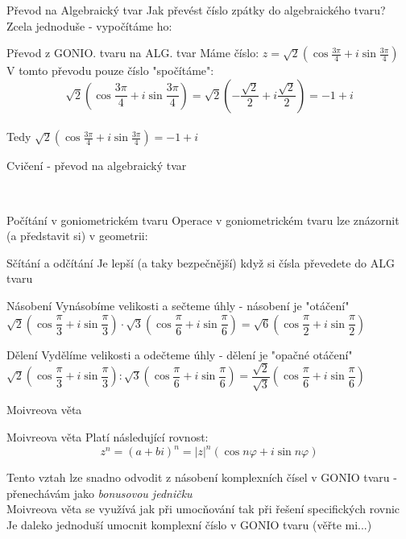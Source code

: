 \documentclass[aspectratio=169]{beamer} %
\newcommand{\reseni}[1]{\ \hfill \hyperlink{#1}{\beamergotobutton{\Large Řešení}}}
\begin{document}
	\begin{frame}{Převod na Algebraický tvar}
	 Jak převést číslo zpátky do algebraického tvaru? Zcela jednoduše - vypočítáme ho:
	 \begin{alertblock}{Převod z GONIO. tvaru na ALG. tvar}
	  Máme číslo: $z=\sqrt{2}(\cos\frac{3\pi}{4}+i\sin\frac{3\pi}{4})$\\[2ex]
	  V tomto převodu pouze číslo "spočítáme": \\[2ex]
	  $$\sqrt{2}\left(\cos\dfrac{3\pi}{4}+i\sin\dfrac{3\pi}{4}\right) = \sqrt{2}\left(-\dfrac{\sqrt{2}}{2}+i\dfrac{\sqrt{2}}{2}\right) = -1+i$$ \\[2ex] Tedy $\sqrt{2}(\cos\frac{3\pi}{4}+i\sin\frac{3\pi}{4}) = -1+i$
	 \end{alertblock}
	\end{frame}
	
	\begin{frame}[label=C4]{Cvičení - převod na algebraický tvar}
	
	\reseni{Ř4}
	\end{frame}
	
	\begin{frame}{Počítání v goniometrickém tvaru}
	Operace v goniometrickém tvaru lze znázornit (a představit si) v geometrii: 
 	 \begin{alertblock}{Sčítání a odčítání}
 	  Je lepší (a taky bezpečnější) když si čísla převedete do ALG tvaru
 	 \end{alertblock}	
 	 \begin{alertblock}{Násobení}
 	 Vynásobíme velikosti a sečteme úhly - násobení je "otáčení" \\
 	 $\sqrt{2}\left(\cos \dfrac{\pi}{3} + i\sin \dfrac{\pi}{3}\right)\cdot \sqrt{3}\left(\cos \dfrac{\pi}{6} + i\sin \dfrac{\pi}{6}\right) = \sqrt{6}\left(\cos \dfrac{\pi}{2} + i\sin \dfrac{\pi}{2}\right)$
 	 \end{alertblock}
 	 \begin{alertblock}{Dělení}
 	 Vydělíme velikosti a odečteme úhly - dělení je "opačné otáčení" \\
 	 $\sqrt{2}\left(\cos \dfrac{\pi}{3} + i\sin \dfrac{\pi}{3}\right):\sqrt{3}\left(\cos \dfrac{\pi}{6} + i\sin \dfrac{\pi}{6}\right) = \dfrac{\sqrt{2}}{\sqrt{3}}\left(\cos \dfrac{\pi}{6} + i\sin \dfrac{\pi}{6}\right)$
 	 \end{alertblock}
	\end{frame}
		
	\begin{frame}{Moivreova věta}
	 \begin{alertblock}{Moivreova věta}
	 Platí následující rovnost:
	 $$z^n = (a+bi)^n = |z|^n(\cos n\varphi + i\sin n\varphi)$$
	 \end{alertblock}
	 Tento vztah lze snadno odvodit z násobení komplexních čísel v GONIO tvaru - přenechávám jako \textit{bonusovou jedničku} \\[2ex]
	 Moivreova věta se využívá jak při umocňování tak při řešení specifických rovnic \\[2ex]
	 Je daleko jednoduší umocnit komplexní číslo v GONIO tvaru (věřte mi...) \\[2ex]
	\end{frame}
	
\end{document}

